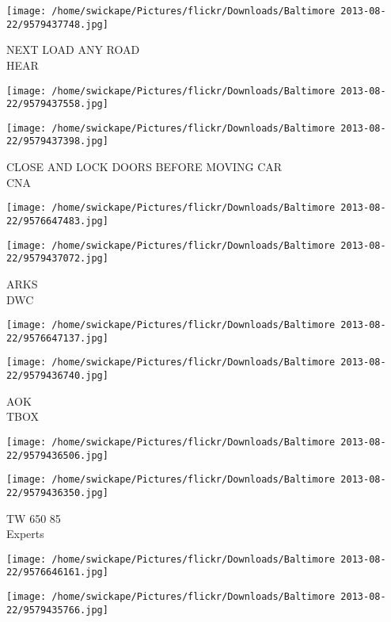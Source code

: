 \documentclass[10pt,letterpaper]{article}
\begin{document}
\vspace{0.25in}
\texttt{[image: /home/swickape/Pictures/flickr/Downloads/Baltimore 2013-08-22/9579437748.jpg]}

NEXT LOAD ANY ROAD\\
HEAR
\pagebreak

\texttt{[image: /home/swickape/Pictures/flickr/Downloads/Baltimore 2013-08-22/9579437558.jpg]}

\vspace{0.25in}
\texttt{[image: /home/swickape/Pictures/flickr/Downloads/Baltimore 2013-08-22/9579437398.jpg]}

CLOSE AND LOCK DOORS BEFORE MOVING CAR\\
CNA
\pagebreak

\texttt{[image: /home/swickape/Pictures/flickr/Downloads/Baltimore 2013-08-22/9576647483.jpg]}

\vspace{0.25in}
\texttt{[image: /home/swickape/Pictures/flickr/Downloads/Baltimore 2013-08-22/9579437072.jpg]}

ARKS\\
DWC
\pagebreak

\texttt{[image: /home/swickape/Pictures/flickr/Downloads/Baltimore 2013-08-22/9576647137.jpg]}

\vspace{0.25in}
\texttt{[image: /home/swickape/Pictures/flickr/Downloads/Baltimore 2013-08-22/9579436740.jpg]}

AOK\\
TBOX
\pagebreak

\texttt{[image: /home/swickape/Pictures/flickr/Downloads/Baltimore 2013-08-22/9579436506.jpg]}

\vspace{0.25in}
\texttt{[image: /home/swickape/Pictures/flickr/Downloads/Baltimore 2013-08-22/9579436350.jpg]}

TW 650 85\\
Experts
\pagebreak

\texttt{[image: /home/swickape/Pictures/flickr/Downloads/Baltimore 2013-08-22/9576646161.jpg]}

\vspace{0.25in}
\texttt{[image: /home/swickape/Pictures/flickr/Downloads/Baltimore 2013-08-22/9579435766.jpg]}
\end{document}
